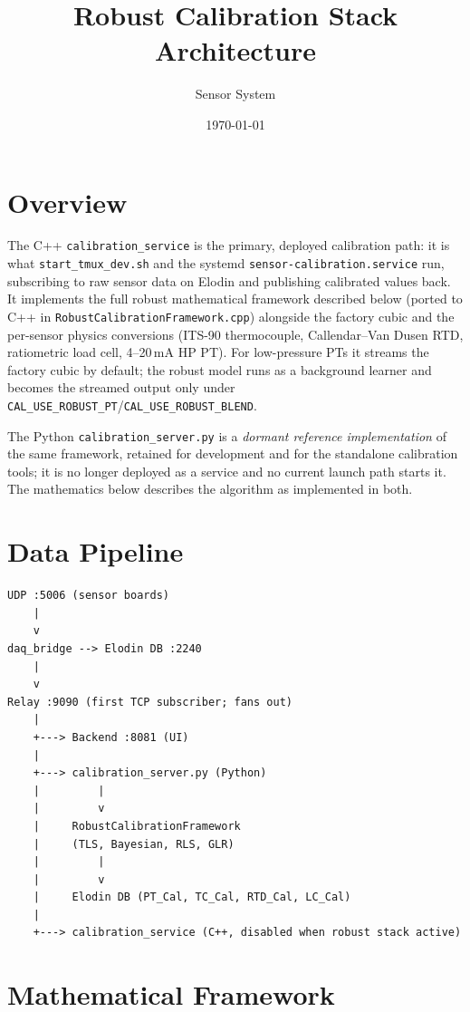 \documentclass[11pt]{article}
\title{Robust Calibration Stack Architecture}
\author{Sensor System}
\date{\today}
\begin{document}
\maketitle

\section{Overview}

The C++ \texttt{calibration\_service} is the primary, deployed calibration path: it is what \texttt{start\_tmux\_dev.sh} and the systemd \texttt{sensor-calibration.service} run, subscribing to raw sensor data on Elodin and publishing calibrated values back. It implements the full robust mathematical framework described below (ported to C++ in \texttt{RobustCalibrationFramework.cpp}) alongside the factory cubic and the per-sensor physics conversions (ITS-90 thermocouple, Callendar--Van Dusen RTD, ratiometric load cell, 4--20\,mA HP PT). For low-pressure PTs it streams the factory cubic by default; the robust model runs as a background learner and becomes the streamed output only under \texttt{CAL\_USE\_ROBUST\_PT}/\texttt{CAL\_USE\_ROBUST\_BLEND}.

The Python \texttt{calibration\_server.py} is a \emph{dormant reference implementation} of the same framework, retained for development and for the standalone calibration tools; it is no longer deployed as a service and no current launch path starts it. The mathematics below describes the algorithm as implemented in both.

\section{Data Pipeline}

\begin{verbatim}
UDP :5006 (sensor boards)
    |
    v
daq_bridge --> Elodin DB :2240
    |
    v
Relay :9090 (first TCP subscriber; fans out)
    |
    +---> Backend :8081 (UI)
    |
    +---> calibration_server.py (Python)
    |         |
    |         v
    |     RobustCalibrationFramework
    |     (TLS, Bayesian, RLS, GLR)
    |         |
    |         v
    |     Elodin DB (PT_Cal, TC_Cal, RTD_Cal, LC_Cal)
    |
    +---> calibration_service (C++, disabled when robust stack active)
\end{verbatim}

\section{Mathematical Framework}
\end{document}
